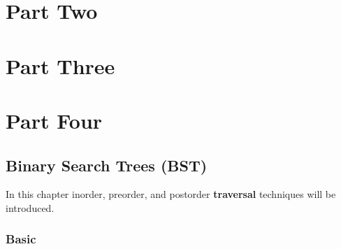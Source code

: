 \documentclass[11pt,fleqn]{book}
\begin{document}
\part{Part Two}





\part{Part Three}


\part{Part Four}

\chapter{Binary Search Trees (BST)}
In this chapter inorder, preorder, and postorder \textbf{traversal} techniques will be introduced. 
\section{Basic}
\end{document}
